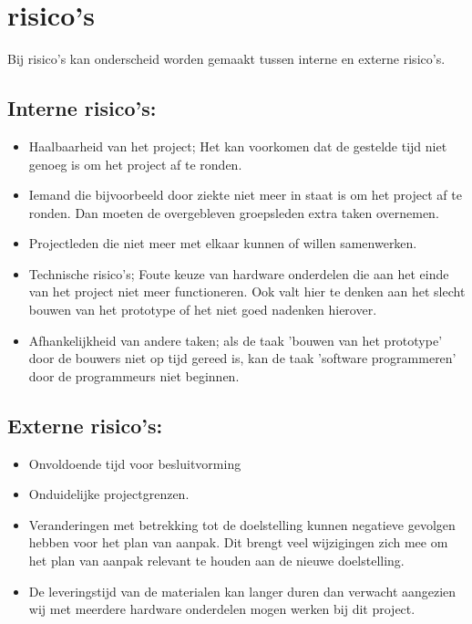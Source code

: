\documentclass[oneside]{book}
\begin{document}
\chapter{risico's}
Bij risico's kan onderscheid worden gemaakt tussen interne
en externe risico's.

\section*{Interne risico's:}
\begin{itemize}
\item Haalbaarheid van het project; Het kan voorkomen dat de gestelde tijd niet genoeg is om het project af te ronden.
\item Iemand die bijvoorbeeld door ziekte niet meer in staat is om het project af te ronden. Dan moeten de overgebleven groepsleden extra taken overnemen. 
\item Projectleden die niet meer met elkaar kunnen of willen samenwerken.
\item Technische risico's; Foute keuze van hardware onderdelen die aan het einde van het project niet meer functioneren. Ook valt hier te denken aan het slecht bouwen van het prototype of het niet goed nadenken hierover.
\item Afhankelijkheid  van andere taken; als de taak 'bouwen van het prototype' door de bouwers niet op tijd gereed is, kan de taak 'software programmeren' door de programmeurs niet beginnen.
\end{itemize}
 

\section*{Externe risico's:}
\begin{itemize}
\item Onvoldoende tijd voor besluitvorming
\item Onduidelijke projectgrenzen. 
\item Veranderingen met betrekking tot de doelstelling kunnen negatieve gevolgen hebben voor het plan van aanpak. Dit brengt veel wijzigingen zich mee om het plan van aanpak relevant te houden aan de nieuwe doelstelling. 
\item De leveringstijd van de materialen kan langer duren dan verwacht aangezien wij met meerdere hardware onderdelen mogen werken bij dit project.   
\end{itemize} 
  
\clearpage
\end{document}
